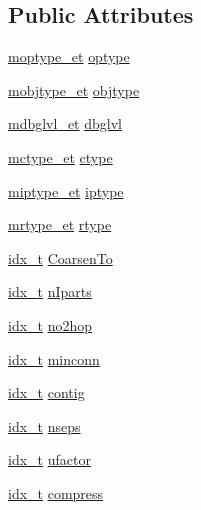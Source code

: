 \subsection*{Public Attributes}
\begin{DoxyCompactItemize}
\item 
\hyperlink{a00876_a64ee21e6d3a57701a812d0903a2f0401}{moptype\+\_\+et} \hyperlink{a00742_a4bdbbc6060bc967ed4edeac6df20a5c8}{optype}
\item 
\hyperlink{a00876_ad8332705ea18c63b06801b0630db9bb8}{mobjtype\+\_\+et} \hyperlink{a00742_aeccfadc19b99c537254075120af879bc}{objtype}
\item 
\hyperlink{a00876_ac50415aa8003f9b7bf0aabb2b0d50877}{mdbglvl\+\_\+et} \hyperlink{a00742_a97ccd0cc307eee1c430679f6a9d41d0c}{dbglvl}
\item 
\hyperlink{a00876_a51d3bfb2bd8dc4a84636b2b489f575bc}{mctype\+\_\+et} \hyperlink{a00742_a7e3099b031b9dbb0f91fe5fc310a5263}{ctype}
\item 
\hyperlink{a00876_a7f13d793623003e25bbbcd5dd7dead89}{miptype\+\_\+et} \hyperlink{a00742_a9d217a96cfccfd2199727900dc3f6c46}{iptype}
\item 
\hyperlink{a00876_a54ec0069de1eb28daca5cf43617e57e4}{mrtype\+\_\+et} \hyperlink{a00742_a9a5e805fb214f1073f147f28f547201a}{rtype}
\item 
\hyperlink{a00876_aaa5262be3e700770163401acb0150f52}{idx\+\_\+t} \hyperlink{a00742_a5f4e7c5bbef13001912e0bb3a161862e}{Coarsen\+To}
\item 
\hyperlink{a00876_aaa5262be3e700770163401acb0150f52}{idx\+\_\+t} \hyperlink{a00742_ad6cb0c7aa46b56d1061fbe2ff8916b72}{n\+Iparts}
\item 
\hyperlink{a00876_aaa5262be3e700770163401acb0150f52}{idx\+\_\+t} \hyperlink{a00742_a8a8e7e0be0d5ff231c4ef2f0b7e50edd}{no2hop}
\item 
\hyperlink{a00876_aaa5262be3e700770163401acb0150f52}{idx\+\_\+t} \hyperlink{a00742_aeecdd5a52f8624eb1563bea4ba696caf}{minconn}
\item 
\hyperlink{a00876_aaa5262be3e700770163401acb0150f52}{idx\+\_\+t} \hyperlink{a00742_a40f67c7f32893cc78d622b802055bc11}{contig}
\item 
\hyperlink{a00876_aaa5262be3e700770163401acb0150f52}{idx\+\_\+t} \hyperlink{a00742_a245a4bc9eb3b49104ce24a22ba0cb9a9}{nseps}
\item 
\hyperlink{a00876_aaa5262be3e700770163401acb0150f52}{idx\+\_\+t} \hyperlink{a00742_addd3712860b894870748f12557b20d89}{ufactor}
\item 
\hyperlink{a00876_aaa5262be3e700770163401acb0150f52}{idx\+\_\+t} \hyperlink{a00742_ac9e93fdb03a2eefa04a25f6035983428}{compress}

\end{DoxyCompactItemize}
